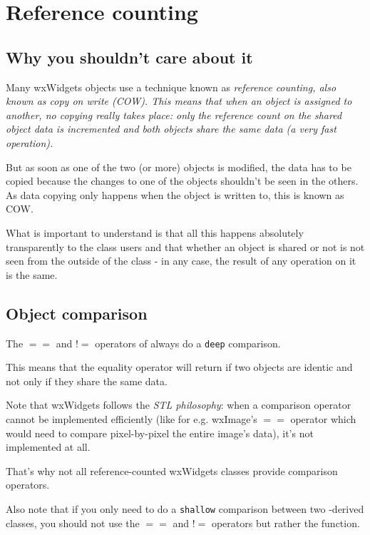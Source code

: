 \section{Reference counting}\label{trefcount}

\subsection{Why you shouldn't care about it}\label{refcount}

Many wxWidgets objects use a technique known as \it{reference counting}, also known
as {\it copy on write} (COW).
This means that when an object is assigned to another, no copying really takes place:
only the reference count on the shared object data is incremented and both objects
share the same data (a very fast operation).

But as soon as one of the two (or more) objects is modified, the data has to be
copied because the changes to one of the objects shouldn't be seen in the
others. As data copying only happens when the object is written to, this is
known as COW.

What is important to understand is that all this happens absolutely
transparently to the class users and that whether an object is shared or not
is not seen from the outside of the class - in any case, the result of any
operation on it is the same.

\subsection{Object comparison}\label{refcountequality}

The $==$ and $!=$ operators of 
always do a {\tt deep} comparison.

This means that the equality operator will return \true if two objects are
identic and not only if they share the same data.

Note that wxWidgets follows the {\it STL philosophy}: when a comparison operator cannot
be implemented efficiently (like for e.g. wxImage's $==$ operator which would need to
compare pixel-by-pixel the entire image's data), it's not implemented at all.

That's why not all reference-counted wxWidgets classes provide comparison operators.

Also note that if you only need to do a {\tt shallow} comparison between two
-derived classes, you should not use the $==$ and $!=$ operators
but rather the  function.


